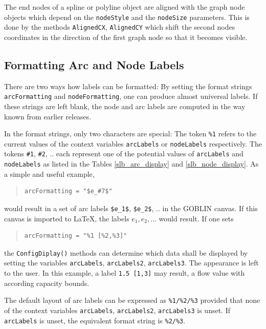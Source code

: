 \documentclass[a4paper,11pt,twoside]{book}
\begin{document}
\begin{multicols}{2}
The end nodes of a spline or polyline object are aligned with the graph
node objects which depend on the \verb/nodeStyle/ and the \verb/nodeSize/
parameters. This is done by the methods \verb/AlignedCX/, \verb/AlignedCY/
which shift the second nodes coordinates in the direction of the first graph
node so that it becomes visible.


\subsection{Formatting Arc and Node Labels}
There are two ways how labels can be formatted: By setting the format strings
\verb/arcFormatting/ and  \verb/nodeFormatting/, one can produce almost
universal labels. If these strings are left blank, the node and arc labels
are computed in the way known from earlier releases. 

In the format strings, only two characters are special: The token \verb/%1/
refers to the current values of the context variables \verb/arcLabels/ or
\verb/nodeLabels/ respectively. The tokens \verb/#1/, \verb/#2/, .. each
represent one of the potential values of \verb/arcLabels/ and \verb/nodeLabels/
as listed in the Tables \ref{slb_arc_display} and \ref{slb_node_display}.
As a simple and useful example,
\begin{quote}
\begin{verbatim}
arcFormatting = "$e_#7$"
\end{verbatim}
\end{quote}
would result in a set of arc labels \verb/$e_1$/, \verb/$e_2$/, .. in the
GOBLIN canvas. If this canvas is imported to LaTeX, the labels $e_1, e_2,\dots$
would result. If one sets
\begin{quote}
\begin{verbatim}
arcFormatting = "%1 [%2,%3]"
\end{verbatim}
\end{quote}
the \verb/ConfigDiplay()/ methods can determine which data shall be displayed
by setting the variables \verb/arcLabels/, \verb/arcLabels2/, \verb/arcLabels3/.
The appearance is left to the user. In this example, a label \verb/1.5 [1,3]/
may result, a flow value with according capacity bounds.

The default layout of arc labels can be expressed as \verb|%1/%2/%3| provided
that none of the context variables \verb/arcLabels/, \verb/arcLabels2/,
\verb/arcLabels3/ is unset. If \verb/arcLabels/ is unset, the equivalent format
string is \verb|%2/%3|. 



\end{multicols}
\end{document}
